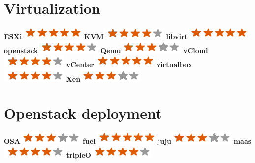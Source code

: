 \documentclass[]{friggeri-cv}
\begin{document}
\begin{aside}
    \section{Virtualization}
        \textbf{ESXi}\includegraphics[scale=0.40]{img/5stars.png}
        \textbf{KVM}\includegraphics[scale=0.40]{img/4stars.png}
        \textbf{libvirt}\includegraphics[scale=0.40]{img/5stars.png}
        \textbf{openstack}\includegraphics[scale=0.40]{img/4stars.png}
        \textbf{Qemu}\includegraphics[scale=0.40]{img/3stars.png}
        \textbf{vCloud}\includegraphics[scale=0.40]{img/4stars.png}
        \textbf{vCenter}\includegraphics[scale=0.40]{img/5stars.png}
        \textbf{virtualbox}\includegraphics[scale=0.40]{img/4stars.png}
        \textbf{Xen}\includegraphics[scale=0.40]{img/3stars.png}
	~
    \section{Openstack deployment}
        \textbf{OSA}\includegraphics[scale=0.40]{img/3stars.png}
        \textbf{fuel}\includegraphics[scale=0.40]{img/5stars.png}
        \textbf{juju}\includegraphics[scale=0.40]{img/3stars.png}
        \textbf{maas}\includegraphics[scale=0.40]{img/4stars.png}
        \textbf{tripleO}\includegraphics[scale=0.40]{img/4stars.png}
	~

\end{aside}
\end{document}
